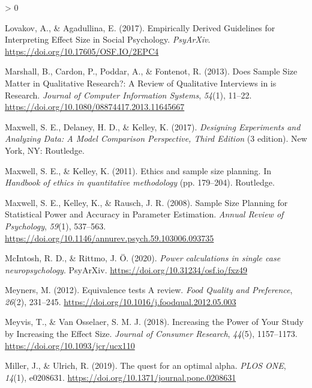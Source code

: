 \documentclass[
  english,
  ,jou, a4paper,floatsintext]{apa6}
\newlength{\cslhangindent}
\newenvironment{CSLReferences}[2] %
 {%
  \setlength{\parindent}{0pt}
  \ifodd #1 \everypar{\setlength{\hangindent}{\cslhangindent}}\ignorespaces\fi
  \ifnum #2 > 0
  \setlength{\parskip}{#2\baselineskip}
  \fi
 }%
 {}
\begin{document}
\begin{CSLReferences}{1}{0}
\leavevmode\hypertarget{ref-lovakov_empirically_2017}{}%
Lovakov, A., \& Agadullina, E. (2017). Empirically {Derived Guidelines} for {Interpreting Effect Size} in {Social Psychology}. \emph{PsyArXiv}. \url{https://doi.org/10.17605/OSF.IO/2EPC4}

\leavevmode\hypertarget{ref-marshall_does_2013}{}%
Marshall, B., Cardon, P., Poddar, A., \& Fontenot, R. (2013). Does {Sample Size Matter} in {Qualitative Research}?: A {Review} of {Qualitative Interviews} in is {Research}. \emph{Journal of Computer Information Systems}, \emph{54}(1), 11--22. \url{https://doi.org/10.1080/08874417.2013.11645667}

\leavevmode\hypertarget{ref-maxwell_designing_2017}{}%
Maxwell, S. E., Delaney, H. D., \& Kelley, K. (2017). \emph{Designing {Experiments} and {Analyzing Data}: A {Model Comparison Perspective}, {Third Edition}} (3 edition). {New York, NY}: {Routledge}.

\leavevmode\hypertarget{ref-maxwell_ethics_2011}{}%
Maxwell, S. E., \& Kelley, K. (2011). Ethics and sample size planning. In \emph{Handbook of ethics in quantitative methodology} (pp. 179--204). {Routledge}.

\leavevmode\hypertarget{ref-maxwell_sample_2008}{}%
Maxwell, S. E., Kelley, K., \& Rausch, J. R. (2008). Sample {Size Planning} for {Statistical Power} and {Accuracy} in {Parameter Estimation}. \emph{Annual Review of Psychology}, \emph{59}(1), 537--563. \url{https://doi.org/10.1146/annurev.psych.59.103006.093735}

\leavevmode\hypertarget{ref-mcintosh_power_2020}{}%
McIntosh, R. D., \& Rittmo, J. Ö. (2020). \emph{Power calculations in single case neuropsychology}. {PsyArXiv}. \url{https://doi.org/10.31234/osf.io/fxz49}

\leavevmode\hypertarget{ref-meyners_equivalence_2012}{}%
Meyners, M. (2012). Equivalence tests {} {A} review. \emph{Food Quality and Preference}, \emph{26}(2), 231--245. \url{https://doi.org/10.1016/j.foodqual.2012.05.003}

\leavevmode\hypertarget{ref-meyvis_increasing_2018}{}%
Meyvis, T., \& Van Osselaer, S. M. J. (2018). Increasing the {Power} of {Your Study} by {Increasing} the {Effect Size}. \emph{Journal of Consumer Research}, \emph{44}(5), 1157--1173. \url{https://doi.org/10.1093/jcr/ucx110}

\leavevmode\hypertarget{ref-miller_quest_2019}{}%
Miller, J., \& Ulrich, R. (2019). The quest for an optimal alpha. \emph{PLOS ONE}, \emph{14}(1), e0208631. \url{https://doi.org/10.1371/journal.pone.0208631}


\end{CSLReferences}
\end{document}
